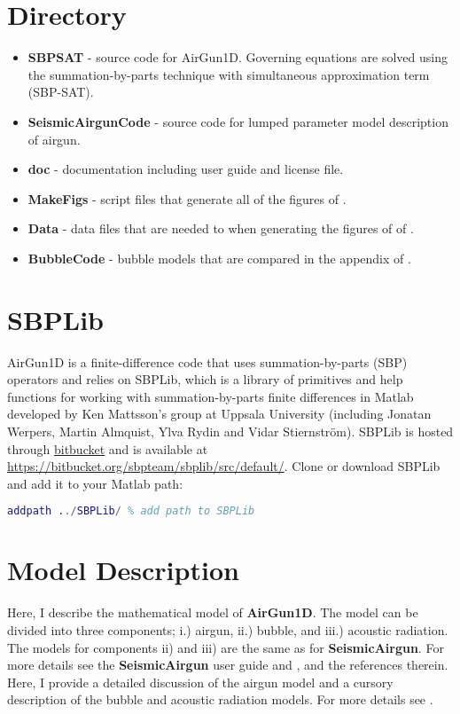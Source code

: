 \documentclass[10pt]{article}
\begin{document}
\section{Directory}
\begin{itemize}
\item{\bf SBPSAT} - source code for AirGun1D. Governing equations are solved using the summation-by-parts technique with simultaneous approximation term (SBP-SAT).
\item {\bf SeismicAirgunCode} - source code for lumped parameter model description of airgun.
\item {\bf doc} - documentation including user guide and license file.
\item {\bf MakeFigs} - script files that generate all of the figures of \citet{Watson2019_airgun}.
\item {\bf Data} - data files that are needed to when generating the figures of of \citet{Watson2019_airgun}.
\item {\bf BubbleCode} - bubble models that are compared in the appendix of \citet{Watson2019_airgun}.
\end{itemize}

\section{SBPLib}
AirGun1D is a finite-difference code that uses summation-by-parts (SBP) operators \cite{Svard2014} and relies on SBPLib, which is a library of primitives and help functions for working with summation-by-parts finite differences in Matlab developed by Ken Mattsson's group at Uppsala University (including Jonatan Werpers, Martin Almquist, Ylva Rydin and Vidar Stiernstr\"{o}m). SBPLib is hosted through \href{https:bitbucket.org}{bitbucket} and is available at \href{https://bitbucket.org/sbpteam/sbplib/src/default/}{https://bitbucket.org/sbpteam/sbplib/src/default/}. Clone or download SBPLib and add it to your Matlab path:
\begin{lstlisting}[language=Matlab]
addpath ../SBPLib/ % add path to SBPLib
\end{lstlisting}

\section{Model Description}
Here, I describe the mathematical model of {\bf AirGun1D}. The model can be divided into three components; i.) airgun, ii.) bubble, and iii.) acoustic radiation. The models for components ii) and iii) are the same as for {\bf SeismicAirgun}. For more details see the {\bf SeismicAirgun} user guide and \citet{Chelminski2019}, \citet{Watson2016} and the references therein. Here, I provide a detailed discussion of the airgun model and a cursory description of the bubble and acoustic radiation models. For more details see \citet{Watson2019_airgun}.
\end{document}
